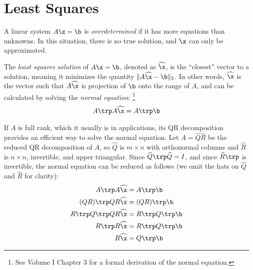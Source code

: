 \label{lab:qr-applications}

\section*{Least Squares} %

A linear system $A\x = \b$ is \emph{overdetermined} if it has more equations than unknowns.
In this situation, there is no true solution, and $\x$ can only be approximated.

The \emph{least squares solution} of $A\x = \b$, denoted as $\widehat{\x}$, is the ``closest'' vector to a solution, meaning it minimizes the quantity $\|A\widehat{\x} - \b\|_2$.
In other words, $\widehat{\x}$ is the vector such that $A\widehat{\x}$ is projection of $\b$ onto the range of $A$, and can be calculated by solving the \emph{normal equation}:%
\footnote{See Volume I Chapter 3 for a formal derivation of the normal equation.}
\[A\trp A\widehat{\x} = A\trp \b\]

If $A$ is full rank, which it usually is in applications, its QR decomposition provides an efficient way to solve the normal equation.
Let $A = \widehat{Q}\widehat{R}$ be the reduced QR decomposition of $A$, so $\widehat{Q}$ is $m \times n$ with orthonormal columns and $\widehat{R}$ is $n \times n$, invertible, and upper triangular.
Since $\widehat{Q}\trp \widehat{Q} = I$, and since $\widehat{R}\trp$ is invertible, the normal equation can be reduced as follows (we omit the hats on $\widehat{Q}$ and $\widehat{R}$ for clarity):
%
\begin{align}
\nonumber
A\trp A\widehat{\x} &= A\trp \b \\ \nonumber
(Q R)\trp Q R  \widehat{\x}
&= (Q R)\trp \b \\ \nonumber
 R\trp Q\trp Q R  \widehat{\x}
&=  R\trp Q\trp \b \\ \nonumber
 R\trp R \widehat{\x}
&=  R\trp Q\trp \b \\
 R \widehat{\x}
&= Q\trp \b \label{eq:normal-equation-via-qr}
\end{align}

